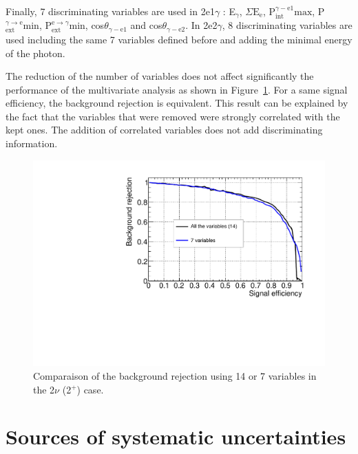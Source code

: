 \documentclass[main.tex]{subfiles}
\begin{document}
\bigskip


\NI Finally, 7 discriminating variables are used in 2e1$\gamma$ : E$_{\gamma}$, $\Sigma\text{E}_\text{e}$, P$_{\text{int}}^{\gamma-\text{e1}} \text{max}$, P$_{\text{ext}}^{\gamma \rightarrow \text{e}} \text{min}$, P$_{\text{ext}}^{\text{e} \rightarrow \gamma} \text{min}$, cos$\theta_{\gamma-\text{e1}}$ and cos$\theta_{\gamma-\text{e2}}$. In 2e2$\gamma$, 8 discriminating variables are used including the same 7 variables defined before and adding the minimal energy of the photon.


\bigskip


\NI The reduction of the number of variables does not affect significantly the performance of the multivariate analysis as shown in Figure~\ref{CompareTMVA}. For a same signal efficiency, the background rejection is equivalent. This result can be explained by the fact that the variables that were removed were strongly correlated with the kept ones. The addition of correlated variables does not add discriminating information.




\begin{figure} [h!]
\begin{center}
\includegraphics[scale=0.50]{pictures/FinalResults/bb2nu2/150/preselection/CompareTMVAReductionVar.pdf}
\end{center}
\caption{Comparaison of the background rejection using 14 or 7 variables in the 2$\nu$ (2$^+$) case.}
\label{CompareTMVA}
\end{figure}


\FloatBarrier


\section{Sources of systematic uncertainties}\label{sec:SourceOfSystematics}
\end{document}
